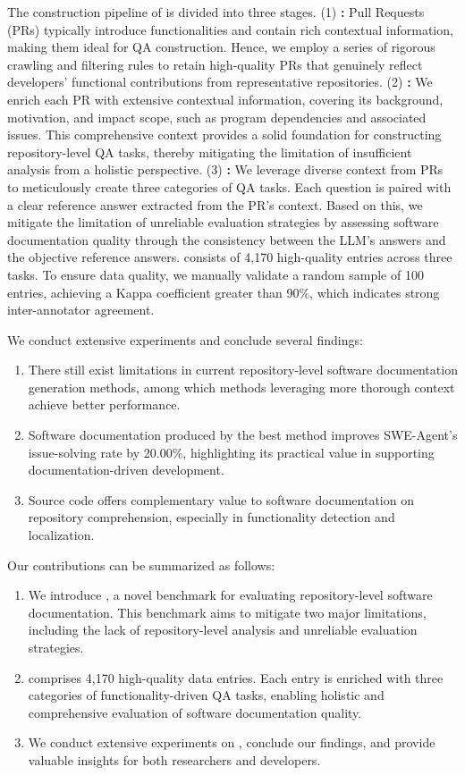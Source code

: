 The construction pipeline of \benchmark is divided into three stages. (1) \textbf{\moduleA:} Pull Requests (PRs) typically introduce functionalities and contain rich contextual information, making them ideal for QA construction. Hence, we employ a series of rigorous crawling and filtering rules to retain high-quality PRs that genuinely reflect developers' functional contributions from representative repositories. (2) \textbf{\moduleB:} We enrich each PR with extensive contextual information, covering its background, motivation, and impact scope, such as program dependencies and associated issues. This comprehensive context provides a solid foundation for constructing repository-level QA tasks, thereby mitigating the limitation of insufficient analysis from a holistic perspective. (3) \textbf{\moduleC:} We leverage diverse context from PRs to meticulously create three categories of QA tasks. Each question is paired with a clear reference answer extracted from the PR's context. Based on this, we mitigate the limitation of unreliable evaluation strategies by assessing software documentation quality through the consistency between the LLM’s answers and the objective reference answers. \benchmark consists of 4,170 high-quality entries across three tasks. To ensure data quality, we manually validate a random sample of 100 entries, achieving a Kappa coefficient greater than 90\%, which indicates strong inter-annotator agreement. 
 
We conduct extensive experiments and conclude several findings:
\begin{enumerate}[leftmargin=*]
    \item There still exist limitations in current repository-level software documentation generation methods, among which methods leveraging more thorough context achieve better performance.
    \item Software documentation produced by the best method improves SWE-Agent's issue-solving rate by 20.00\%, highlighting its practical value in supporting documentation-driven development.
    \item Source code offers complementary value to software documentation on repository comprehension, especially in functionality detection and localization. 
\end{enumerate}

Our contributions can be summarized as follows:
\begin{enumerate}[leftmargin=*]
    \item We introduce \benchmark, a novel benchmark for evaluating repository-level software documentation. This benchmark aims to mitigate two major limitations, including the lack of repository-level analysis and unreliable evaluation strategies.
    \item \benchmark comprises 4,170 high-quality data entries. Each entry is enriched with three categories of functionality-driven QA tasks, enabling holistic and comprehensive evaluation of software documentation quality.
    \item We conduct extensive experiments on \benchmark, conclude our findings, and provide valuable insights for both researchers and developers.
\end{enumerate}